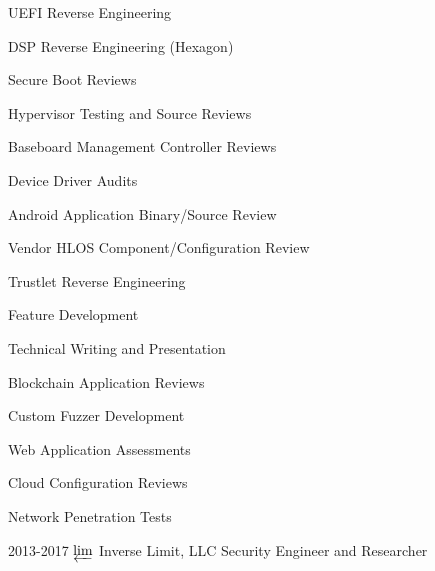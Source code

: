 \documentclass[]{SBResume}
\begin{document}
\begin{resume}
{        %

        \begin{resumemultiitem}
        \item{UEFI Reverse Engineering}
        \item{DSP Reverse Engineering (Hexagon)}
        \item{Secure Boot Reviews}
        \item{Hypervisor Testing and Source Reviews}
        \item{Baseboard Management Controller Reviews}
        \item{Device Driver Audits}
        \end{resumemultiitem}

        \begin{resumemultiitem}
        \item{Android Application Binary/Source Review}
        \item{Vendor HLOS Component/Configuration Review}
        \item{Trustlet Reverse Engineering}
        \item{Feature Development}
        \end{resumemultiitem}

        \begin{resumemultiitem}
        \item{Technical Writing and Presentation}
        \item{Blockchain Application Reviews}
        \item{Custom Fuzzer Development}
        \item{Web Application Assessments}
        \item{Cloud Configuration Reviews}
        \item{Network Penetration Tests}
        \end{resumemultiitem}

      }
  \resumeentry
      {2013-2017}
      {
        \vspace{2.45cm}
        \fontsize{34pt}{1em}
        \:\:$\varprojlim$
      }
      {Inverse Limit, LLC}
      {Security Engineer and Researcher}
      {
        
}
\end{resume}
\end{document}
